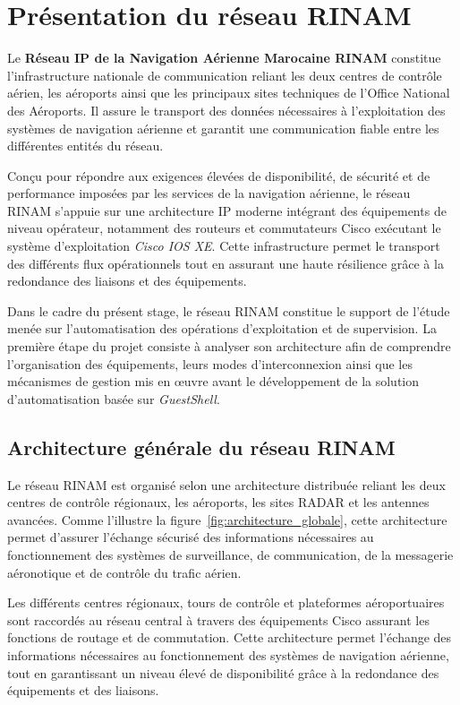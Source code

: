 \documentclass[12pt, a4paper, oneside]{report}
\begin{document}
\section{Présentation du réseau RINAM}

Le \textbf{Réseau IP de la Navigation Aérienne Marocaine \ac{RINAM}} constitue l'infrastructure 
nationale de communication reliant les deux centres de contrôle aérien, les aéroports 
ainsi que les principaux sites techniques de l'Office National des Aéroports. 
Il assure le transport des données nécessaires à l'exploitation des systèmes de navigation 
aérienne et garantit une communication fiable entre les différentes entités du réseau.

Conçu pour répondre aux exigences élevées de disponibilité, de sécurité et de performance 
imposées par les services de la navigation aérienne, le réseau RINAM s'appuie sur une architecture 
IP moderne intégrant des équipements de niveau opérateur, notamment des routeurs et commutateurs 
Cisco exécutant le système d'exploitation \textit{Cisco IOS XE}. Cette infrastructure permet le 
transport des différents flux opérationnels tout en assurant une haute résilience grâce à la 
redondance des liaisons et des équipements.

Dans le cadre du présent stage, le réseau RINAM constitue le support de l'étude menée sur 
l'automatisation des opérations d'exploitation et de supervision. La première étape du projet 
consiste à analyser son architecture afin de comprendre l'organisation des équipements, leurs 
modes d'interconnexion ainsi que les mécanismes de gestion mis en œuvre avant le développement 
de la solution d'automatisation basée sur \textit{GuestShell}. 

\subsection{Architecture générale du réseau RINAM}

Le réseau RINAM est organisé selon une architecture distribuée reliant les deux centres 
de contrôle régionaux, les aéroports, les sites RADAR et les antennes avancées. 
Comme l'illustre la figure~\ref{fig:architecture_globale}, cette architecture permet d'assurer 
l'échange sécurisé des informations nécessaires au fonctionnement des systèmes de surveillance, 
de communication, de la messagerie aéronotique et de contrôle du trafic aérien.

Les différents centres régionaux, tours de contrôle et plateformes aéroportuaires sont 
raccordés au réseau central à travers des équipements Cisco assurant les fonctions de 
routage et de commutation. Cette architecture permet l'échange des informations nécessaires 
au fonctionnement des systèmes de navigation aérienne, tout en garantissant un niveau élevé 
de disponibilité grâce à la redondance des équipements et des liaisons.
\end{document}
